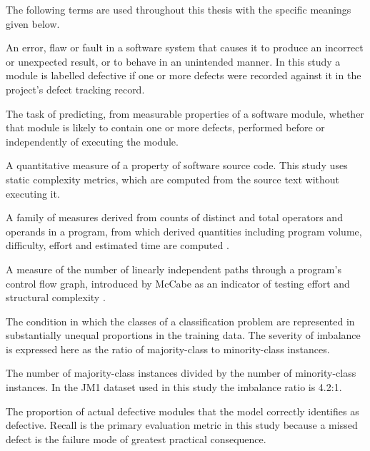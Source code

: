 \documentclass[12pt,a4paper,oneside]{report}
\begin{document}
The following terms are used throughout this thesis with the specific meanings given below.

\begin{description}[leftmargin=0em,style=nextline,itemsep=6pt]
  \item[Software defect (bug):] An error, flaw or fault in a software system that causes it to produce an incorrect or unexpected result, or to behave in an unintended manner. In this study a module is labelled defective if one or more defects were recorded against it in the project's defect tracking record.

  \item[Software defect prediction:] The task of predicting, from measurable properties of a software module, whether that module is likely to contain one or more defects, performed before or independently of executing the module.

  \item[Software metric:] A quantitative measure of a property of software source code. This study uses static complexity metrics, which are computed from the source text without executing it.

  \item[Halstead complexity metrics:] A family of measures derived from counts of distinct and total operators and operands in a program, from which derived quantities including program volume, difficulty, effort and estimated time are computed \cite{halstead1977}.

  \item[Cyclomatic complexity:] A measure of the number of linearly independent paths through a program's control flow graph, introduced by McCabe as an indicator of testing effort and structural complexity \cite{mccabe1976}.

  \item[Class imbalance:] The condition in which the classes of a classification problem are represented in substantially unequal proportions in the training data. The severity of imbalance is expressed here as the ratio of majority-class to minority-class instances.

  \item[Imbalance ratio:] The number of majority-class instances divided by the number of minority-class instances. In the JM1 dataset used in this study the imbalance ratio is 4.2:1.

  \item[Recall (sensitivity):] The proportion of actual defective modules that the model correctly identifies as defective. Recall is the primary evaluation metric in this study because a missed defect is the failure mode of greatest practical consequence.


\end{description}
\end{document}
